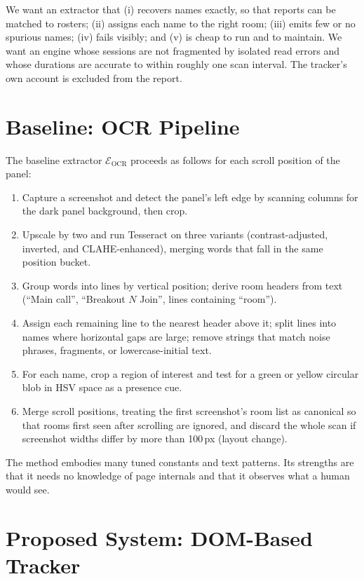 \documentclass[conference]{IEEEtran}
\begin{document}
We want an extractor that (i) recovers names exactly, so that reports can be matched to rosters; (ii) assigns each name to the right room; (iii) emits few or no spurious names; (iv) fails visibly; and (v) is cheap to run and to maintain. We want an engine whose sessions are not fragmented by isolated read errors and whose durations are accurate to within roughly one scan interval. The tracker's own account is excluded from the report.

\section{Baseline: OCR Pipeline}\label{sec:ocr}
The baseline extractor $\mathcal{E}_{\text{OCR}}$ proceeds as follows for each scroll position of the panel:
\begin{enumerate}
\item Capture a screenshot and detect the panel's left edge by scanning columns for the dark panel background, then crop.
\item Upscale by two and run Tesseract on three variants (contrast-adjusted, inverted, and CLAHE-enhanced), merging words that fall in the same position bucket.
\item Group words into lines by vertical position; derive room headers from text (``Main call'', ``Breakout $N$ Join'', lines containing ``room'').
\item Assign each remaining line to the nearest header above it; split lines into names where horizontal gaps are large; remove strings that match noise phrases, fragments, or lowercase-initial text.
\item For each name, crop a region of interest and test for a green or yellow circular blob in HSV space as a presence cue.
\item Merge scroll positions, treating the first screenshot's room list as canonical so that rooms first seen after scrolling are ignored, and discard the whole scan if screenshot widths differ by more than 100\,px (layout change).
\end{enumerate}
The method embodies many tuned constants and text patterns. Its strengths are that it needs no knowledge of page internals and that it observes what a human would see.

\section{Proposed System: DOM-Based Tracker}\label{sec:dom}
\end{document}
